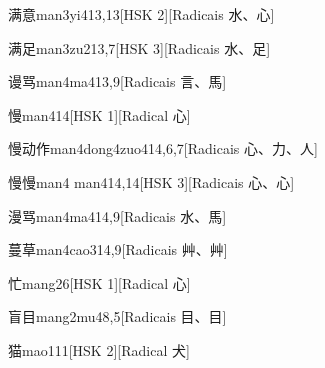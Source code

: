 \begin{entry}{满意}{man3yi4}{13,13}[HSK 2][Radicais ⽔、⼼]
\end{entry}

\begin{entry}{满足}{man3zu2}{13,7}[HSK 3][Radicais ⽔、⾜]
\end{entry}

\begin{entry}{谩骂}{man4ma4}{13,9}[Radicais ⾔、⾺]
\end{entry}

\begin{entry}{慢}{man4}{14}[HSK 1][Radical ⼼]
\end{entry}

\begin{entry}{慢动作}{man4dong4zuo4}{14,6,7}[Radicais ⼼、⼒、⼈]
\end{entry}

\begin{entry}{慢慢}{man4 man4}{14,14}[HSK 3][Radicais ⼼、⼼]
\end{entry}

\begin{entry}{漫骂}{man4ma4}{14,9}[Radicais ⽔、⾺]
\end{entry}

\begin{entry}{蔓草}{man4cao3}{14,9}[Radicais ⾋、⾋]
\end{entry}

\begin{entry}{忙}{mang2}{6}[HSK 1][Radical ⼼]
\end{entry}

\begin{entry}{盲目}{mang2mu4}{8,5}[Radicais ⽬、⽬]
\end{entry}

\begin{entry}{猫}{mao1}{11}[HSK 2][Radical ⽝]
\end{entry}

